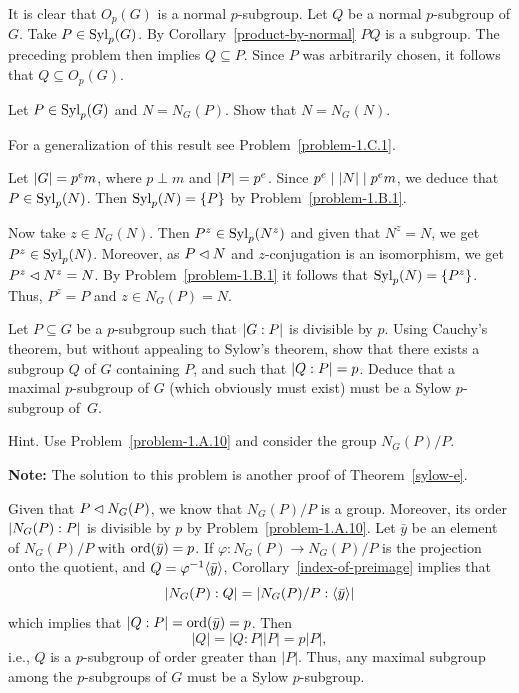 \begin{solution} It is clear that $O_p(G)$ is a normal $p$-subgroup. Let $Q$ be a normal $p$-subgroup of $G$. Take $P\in{\rm Syl}_p(G)$. By Corollary~\ref{product-by-normal} $PQ$ is a subgroup. The preceding problem then implies $Q\subseteq P$. Since $P$ was arbitrarily chosen, it follows that $Q\subseteq O_p(G)$.  \end{solution}

\begin{probl}\label{problem-1.B.3}
    Let $P \in{\rm Syl}_p(G)$ and $N = N_G(P)$. Show that $N = N_G(N)$.

    \textrm{ For a generalization of this result see Problem~\ref{problem-1.C.1}.}
\end{probl}

\begin{solution} Let $\left\vert{G}\right\vert=p^em$, where $p\perp m$ and $\left\vert{P}\right\vert=p^e$. Since $p^e\mid\left\vert{N}\right\vert\mid p^em$, we deduce that $P\in{\rm Syl}_p(N)$. Then ${\rm Syl}_p(N)=\{P\}$ by Problem~\ref{problem-1.B.1}.

Now take $z\in N_G(N)$. Then $P^z\in{\rm Syl}_p(N^z)$ and given that $N^z=N$, we get $P^z\in{\rm Syl}_p(N)$. Moreover, as $P\lhd N$ and $z$-conjugation is an isomorphism, we get $P^z\lhd N^z=N$. By Problem~\ref{problem-1.B.1} it follows that ${\rm Syl}_p(N)=\{P^z\}$. Thus, $P^z=P$ and $z\in N_G(P)=N$.

\end{solution}

\begin{probl}\label{sylow-e-2}
    Let\/ $P\subseteq G$ be a $p$-subgroup such that $\left\vert{G:P}\right\vert$ is divisible by\/ $p$. Using Cauchy's theorem, but without appealing to Sylow's theorem, show that there exists a subgroup\/ $Q$ of\/ $G$ containing\/ $P$, and such that\/ $\left\vert{Q:P}\right\vert=p$. Deduce that a maximal $p$-subgroup of\/ $G$ (which obviously must exist) must be a Sylow $p$-subgroup of\/~$G$.

    \textrm{\upshape Hint. Use Problem~\ref{problem-1.A.10} and consider the group $N_G(P)/P$.}
\end{probl}

    \textrm{{\bf Note:} The solution to this problem is another proof of Theorem~\ref{sylow-e}.}
    
\begin{solution} Given that $P\lhd N_G(P)$, we know that $N_G(P)/P$ is a group. Moreover, its order $\left\vert{N_G(P):P}\right\vert$ is divisible by $p$ by Problem~\ref{problem-1.A.10}. Let $\bar y$ be an element of $N_G(P)/P$ with ${\rm ord}(\bar y)=p$. If $\varphi\colon N_G(P)\to N_G(P)/P$ is the projection onto the quotient, and $Q=\varphi^{-1}\langle\bar y\rangle$, Corollary~\ref{index-of-preimage} implies that
$$
    |N_G(P):Q|=|N_G(P)/P:\langle\bar y\rangle|
$$
which implies that $|Q:P|={\rm ord}(\bar y)=p$. Then
$$
    |Q|=|Q:P||P|=p|P|,
$$
i.e., $Q$ is a $p$-subgroup of order greater than $|P|$. Thus, any maximal subgroup among the $p$-subgroups of $G$ must be a Sylow $p$-subgroup.

\end{solution}



